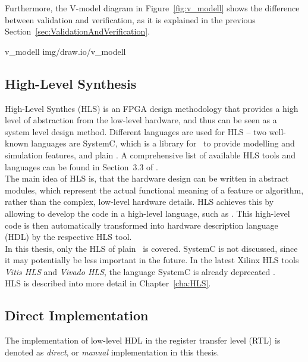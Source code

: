 Furthermore, the V-model diagram in Figure~\ref{fig:v_modell} shows the difference between validation and verification, as it is explained in the previous Section~\ref{sec:ValidationAndVerification}.

 {v_modell} {img/draw.io/v_modell}

\subsection{High-Level Synthesis}

High-Level Synthes (HLS) is an FPGA design methodology that provides a high level of abstraction from the low-level hardware, and thus can be seen as a system level design method.
Different languages are used for HLS -- two well-known languages are SystemC, which is a library for \cplusplus\ to provide modelling and simulation features, and plain \cplusplus.
A comprehensive list of available HLS tools and languages can be found in Section~3.3 of \cite{2016FfSP}.\\

The main idea of HLS is, that the hardware design can be written in abstract modules, which represent the actual functional meaning of a feature or algorithm, rather than the complex, low-level hardware details.
HLS achieves this by allowing to develop the code in a high-level language, such as \cplusplus.
This high-level code is then automatically transformed into hardware description language (HDL) by the respective HLS tool.\\

In this thesis, only the HLS of plain \cplusplus\ is covered.
SystemC is not discussed, since it may potentially be less important in the future.
In the latest Xilinx HLS tools \textit{Vitis HLS} and \textit{Vivado HLS}, the language SystemC is already deprecated \cite{VivadoHlsDeprecatesSystemC}.\\

\noindent
HLS is described into more detail in Chapter~\ref{cha:HLS}.


\subsection{Direct Implementation}

The implementation of low-level HDL in the register transfer level (RTL) is denoted as \textit{direct}, or \textit{manual} implementation in this thesis.\\

